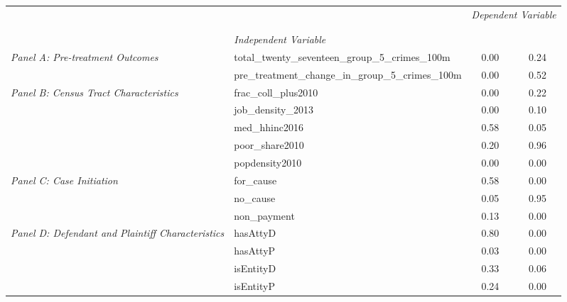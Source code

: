 \begin{tabular}{llcc}
\toprule
 &  & \multicolumn{2}{c}{\textit{Dependent Variable}} \\
\cline{3-4}
\\
 &  &  &  \\
 & \emph{Independent Variable} &  &  \\
\midrule
\multirow[c]{2}{3cm}{\textit{Panel A: Pre-treatment Outcomes}} & total_twenty_seventeen_group_5_crimes_100m & 0.00 & 0.24 \\
 & pre_treatment_change_in_group_5_crimes_100m & 0.00 & 0.52 \\
\cline{1-4}
\multirow[c]{5}{3cm}{\textit{Panel B: Census Tract Characteristics}} & frac_coll_plus2010 & 0.00 & 0.22 \\
 & job_density_2013 & 0.00 & 0.10 \\
 & med_hhinc2016 & 0.58 & 0.05 \\
 & poor_share2010 & 0.20 & 0.96 \\
 & popdensity2010 & 0.00 & 0.00 \\
\cline{1-4}
\multirow[c]{3}{3cm}{\textit{Panel C: Case Initiation}} & for_cause & 0.58 & 0.00 \\
 & no_cause & 0.05 & 0.95 \\
 & non_payment & 0.13 & 0.00 \\
\cline{1-4}
\multirow[c]{4}{3cm}{\textit{Panel D: Defendant and Plaintiff Characteristics}} & hasAttyD & 0.80 & 0.00 \\
 & hasAttyP & 0.03 & 0.00 \\
 & isEntityD & 0.33 & 0.06 \\
 & isEntityP & 0.24 & 0.00 \\
\cline{1-4}
\bottomrule
\end{tabular}
